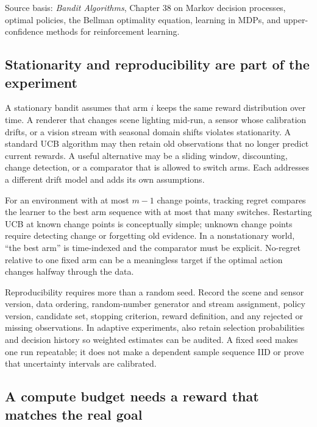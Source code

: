 Source basis: \emph{Bandit Algorithms}, Chapter 38 on Markov decision processes, optimal policies, the Bellman optimality equation, learning in MDPs, and upper-confidence methods for reinforcement learning.

\subsection{Stationarity and reproducibility are part of the experiment}\label{02-foundations-ii-ch029-stationarity-and-reproducibility-are-part-of-the-experiment}

A stationary bandit assumes that arm \(i\) keeps the same reward distribution over time. A renderer that changes scene lighting mid-run, a sensor whose calibration drifts, or a vision stream with seasonal domain shifts violates stationarity. A standard UCB algorithm may then retain old observations that no longer predict current rewards. A useful alternative may be a sliding window, discounting, change detection, or a comparator that is allowed to switch arms. Each addresses a different drift model and adds its own assumptions.

For an environment with at most \(m-1\) change points, tracking regret compares the learner to the best arm sequence with at most that many switches. Restarting UCB at known change points is conceptually simple; unknown change points require detecting change or forgetting old evidence. In a nonstationary world, ``the best arm'' is time-indexed and the comparator must be explicit. No-regret relative to one fixed arm can be a meaningless target if the optimal action changes halfway through the data.

Reproducibility requires more than a random seed. Record the scene and sensor version, data ordering, random-number generator and stream assignment, policy version, candidate set, stopping criterion, reward definition, and any rejected or missing observations. In adaptive experiments, also retain selection probabilities and decision history so weighted estimates can be audited. A fixed seed makes one run repeatable; it does not make a dependent sample sequence IID or prove that uncertainty intervals are calibrated.

\subsection{A compute budget needs a reward that matches the real goal}\label{02-foundations-ii-ch029-a-compute-budget-needs-a-reward-that-matches-the-real-goal}


